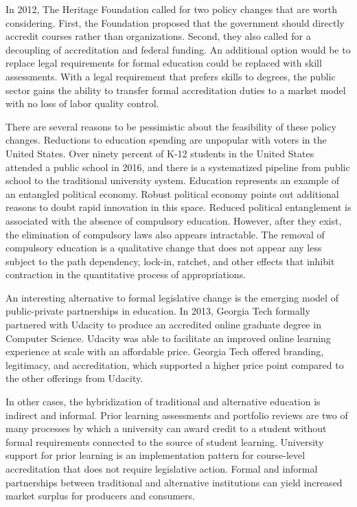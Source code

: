 In 2012, The Heritage Foundation called for two policy changes that are worth considering.
First, the Foundation proposed that the government should directly accredit courses rather than organizations\cite{burke2012accreditation}.
Second, they also called for a decoupling of accreditation and federal funding.
An additional option would be to replace legal requirements for formal education could be replaced with skill assessments.
With a legal requirement that prefers skills to degrees,
the public sector gains the ability to transfer formal accreditation duties to a market model with no loss of labor quality control.

There are several reasons to be pessimistic about the feasibility of these policy changes.
Reductions to education spending are unpopular with voters in the United States.
Over ninety percent of K-12 students in the United States attended a public school in 2016\cite{us2019digest},
and there is a systematized pipeline from public school to the traditional university system.
Education represents an example of an entangled political economy\cite{wagner2014entangled}.
Robust political economy points out additional reasons to doubt rapid innovation in this space\cite{boettke2004liberalism}.
Reduced political entanglement is associated with the absence of compulsory education.
However, after they exist, the elimination of compulsory laws also appears intractable.
The removal of compulsory education is a qualitative change that does not appear any less subject to the path dependency,
lock-in, ratchet, and other effects that inhibit contraction in the quantitative process of appropriations.

An interesting alternative to formal legislative change is the emerging model of public-private partnerships in education.
In 2013, Georgia Tech formally partnered with Udacity to produce an accredited online graduate degree in Computer Science\cite{empson_2013}.
Udacity was able to facilitate an improved online learning experience at scale with an affordable price.
Georgia Tech offered branding, legitimacy, and accreditation, which supported a higher price point compared to the other offerings from Udacity.

In other cases, the hybridization of traditional and alternative education is indirect and informal.
Prior learning assessments and portfolio reviews are two of many processes by which a university can award credit to a student
without formal requirements connected to the source of student learning\cite{conrad2008building}.
University support for prior learning is an implementation pattern for course-level accreditation that does not require legislative action.
Formal and informal partnerships between traditional and alternative institutions can yield increased market surplus for producers and consumers.

